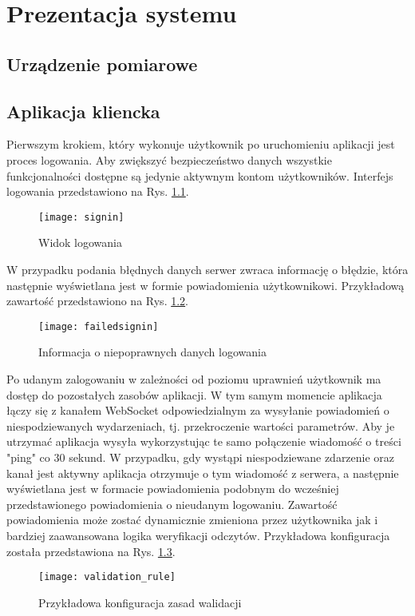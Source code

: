\chapter{Prezentacja systemu}

\section{Urządzenie pomiarowe}


\section{Aplikacja kliencka}
Pierwszym krokiem, który wykonuje użytkownik po uruchomieniu aplikacji jest 
proces logowania. Aby zwiększyć bezpieczeństwo danych wszystkie funkcjonalności
dostępne są jedynie aktywnym kontom użytkowników.
Interfejs logowania przedstawiono na Rys. \ref{atmosphere:signin}.
\begin{figure}[h!]
  \centering
  \texttt{[image: signin]}
  \caption{Widok logowania}
  \label{atmosphere:signin}
\end{figure}
W przypadku podania błędnych danych serwer zwraca informację o błędzie, która następnie
wyświetlana jest w formie powiadomienia użytkownikowi. Przykładową zawartość przedstawiono
na Rys. \ref{atmosphere:failedsignin}.
\begin{figure}[h!]
  \centering
  \texttt{[image: failedsignin]}
  \caption{Informacja o niepoprawnych danych logowania}
  \label{atmosphere:failedsignin}
\end{figure}
Po udanym zalogowaniu w zależności od poziomu uprawnień użytkownik ma dostęp
do pozostałych zasobów aplikacji.
W tym samym momencie aplikacja łączy się z kanałem WebSocket odpowiedzialnym za
wysyłanie powiadomień o niespodziewanych wydarzeniach, tj. przekroczenie
wartości parametrów. Aby je utrzymać aplikacja wysyła wykorzystując te samo
połączenie wiadomość o treści "ping" co 30 sekund. W przypadku, gdy
wystąpi niespodziewane zdarzenie oraz kanał jest aktywny aplikacja otrzymuje
o tym wiadomość z serwera, a następnie wyświetlana jest w formacie powiadomienia
podobnym do wcześniej przedstawionego powiadomienia o nieudanym logowaniu.
Zawartość powiadomienia może zostać dynamicznie zmieniona przez użytkownika
jak i bardziej zaawansowana logika weryfikacji odczytów. Przykładowa konfiguracja
została przedstawiona na Rys. \ref{atmosphere:validation_rule}.
\begin{figure}[h!]
  \centering
  \texttt{[image: validation\_rule]}
  \caption{Przykładowa konfiguracja zasad walidacji}
  \label{atmosphere:validation_rule}
\end{figure}
